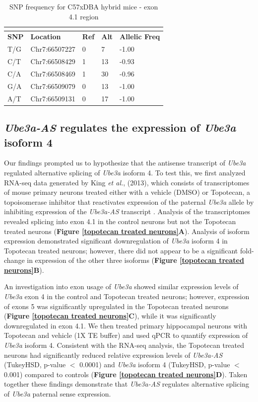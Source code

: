 \begin{longtabu} {X[0.7,c]X[1.2,c]X[0.6,c]X[0.6,c]X[1,c]}
  \caption{SNP frequency for C57xDBA hybrid mice - exon 4.1 region}\\
  \label{snp freq}\\
  \toprule
  \textbf{SNP} & \textbf{Location} & \textbf{Ref} & \textbf{Alt} & \textbf{Allelic Freq}\\
  \midrule
  \endhead
  T/G & Chr7:66507227 & 0 & 7  & -1.00 \\
  C/T & Chr7:66508429 & 1 & 13 & -0.93 \\
  C/A & Chr7:66508469 & 1 & 30 & -0.96 \\
  G/A & Chr7:66509079 & 0 & 13 & -1.00 \\
  A/T & Chr7:66509131 & 0 & 17 & -1.00 \\
  \bottomrule
\end{longtabu}
\subsection{\textit{Ube3a-AS} regulates the expression of \textit{Ube3a} isoform 4}
Our findings prompted us to hypothesize that the antisense transcript of \textit{Ube3a} regulated alternative splicing of \textit{Ube3a} isoform 4.  To test this, we first analyzed RNA-seq data generated by King \textit{et al.}, (2013), which consists of transcriptomes of mouse primary neurons treated either with a vehicle (DMSO) or Topotecan, a topoisomerase inhibitor that reactivates expression of the paternal \textit{Ube3a} allele by inhibiting expression of the \textit{Ube3a-AS} transcript \cite{King2013,Huang2012}.  Analysis of the transcriptomes revealed splicing into exon 4.1 in the control neurons but not the Topotecan treated neurons (\textbf{Figure \ref{topotecan treated neurons}A}). Analysis of isoform expression demonstrated significant downregulation of \textit{Ube3a} isoform 4 in Topotecan treated neurons; however, there did not appear to be a significant fold-change in expression of the other three isoforms (\textbf{Figure \ref{topotecan treated neurons}B}). 

An investigation into exon usage of \textit{Ube3a} showed similar expression levels of \textit{Ube3a} exon 4 in the control and Topotecan treated neurons; however, expression of exons 5 was significantly upregulated in the Topotecan treated neurons (\textbf{Figure \ref{topotecan treated neurons}C}), while it was significantly downregulated in exon 4.1. We then treated primary hippocampal neurons with Topotecan and vehicle (1X TE buffer) and used qPCR to quantify expression of \textit{Ube3a} isoform 4.  Consistent with the RNA-seq analysis, the Topotecan treated neurons had significantly reduced relative expression levels of \textit{Ube3a-AS} (TukeyHSD, p-value $<$ 0.0001) and \textit{Ube3a} isoform 4 (TukeyHSD, p-value $<$ 0.001) compared to controls (\textbf{Figure \ref{topotecan treated neurons}D}). Taken together these findings demonstrate that \textit{Ube3a-AS} regulates alternative splicing of \textit{Ube3a} paternal sense expression.

